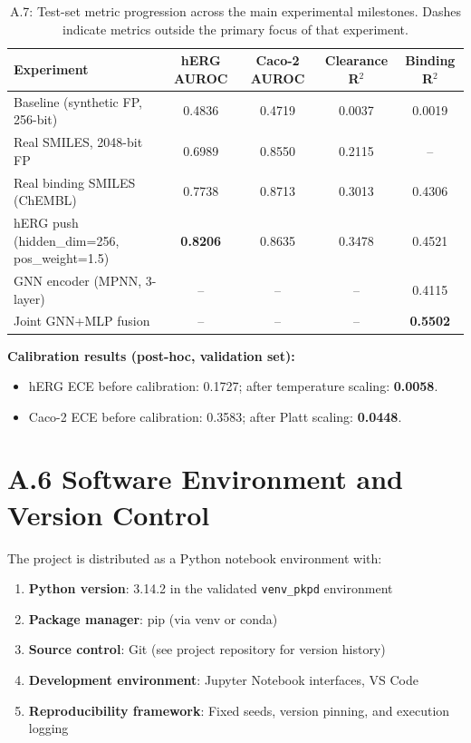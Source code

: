 \documentclass[a4paper,11pt,twoside]{report}
\begin{document}
\begin{table}[htbp]
\centering
\small
\caption{A.7: Test-set metric progression across the main experimental milestones. Dashes indicate metrics outside the primary focus of that experiment.}
\label{tab:extended_results}
\begin{tabular}{p{3.8cm}|c|c|c|c}
\hline
\textbf{Experiment} & \textbf{hERG AUROC} & \textbf{Caco-2 AUROC} & \textbf{Clearance R$^2$} & \textbf{Binding R$^2$} \\
\hline
Baseline (synthetic FP, 256-bit) & 0.4836 & 0.4719 & 0.0037 & 0.0019 \\
Real SMILES, 2048-bit FP & 0.6989 & 0.8550 & 0.2115 & -- \\
Real binding SMILES (ChEMBL) & 0.7738 & 0.8713 & 0.3013 & 0.4306 \\
hERG push (hidden\_dim=256, pos\_weight=1.5) & \textbf{0.8206} & 0.8635 & 0.3478 & 0.4521 \\
GNN encoder (MPNN, 3-layer) & -- & -- & -- & 0.4115 \\
Joint GNN+MLP fusion & -- & -- & -- & \textbf{0.5502} \\
\hline
\end{tabular}
\end{table}

\vspace{0.3cm}

\noindent \textbf{Calibration results (post-hoc, validation set):}
\begin{itemize}
  \item hERG ECE before calibration: 0.1727; after temperature scaling: \textbf{0.0058}.
  \item Caco-2 ECE before calibration: 0.3583; after Platt scaling: \textbf{0.0448}.
\end{itemize}

\section*{A.6 Software Environment and Version Control}

\noindent The project is distributed as a Python notebook environment with:

\begin{enumerate}
\item \textbf{Python version}: 3.14.2 in the validated \texttt{venv\_pkpd} environment
\item \textbf{Package manager}: pip (via venv or conda)
\item \textbf{Source control}: Git (see project repository for version history)
\item \textbf{Development environment}: Jupyter Notebook interfaces, VS Code
\item \textbf{Reproducibility framework}: Fixed seeds, version pinning, and execution logging
\end{enumerate}
\end{document}
